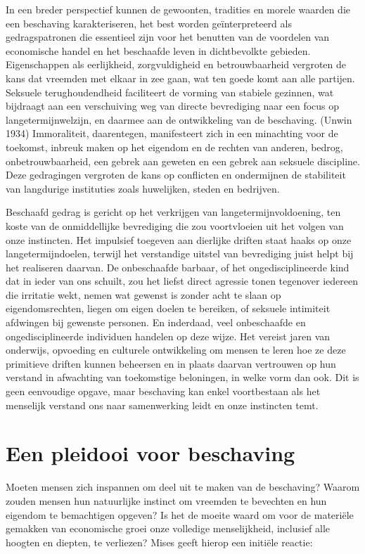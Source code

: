 \documentclass[
  a5paper,
  smalldemyvopaper,11pt,twoside,onecolumn,openright,extrafontsizes,
hidelinks]{memoir}
\begin{document}
In een breder perspectief kunnen de gewoonten, tradities en morele
waarden die een beschaving karakteriseren, het best worden
geïnterpreteerd als gedragspatronen die essentieel zijn voor het
benutten van de voordelen van economische handel en het beschaafde leven
in dichtbevolkte gebieden. Eigenschappen als eerlijkheid, zorgvuldigheid
en betrouwbaarheid vergroten de kans dat vreemden met elkaar in zee
gaan, wat ten goede komt aan alle partijen. Seksuele terughoudendheid
faciliteert de vorming van stabiele gezinnen, wat bijdraagt aan een
verschuiving weg van directe bevrediging naar een focus op
langetermijnwelzijn, en daarmee aan de ontwikkeling van de beschaving.
(Unwin 1934) Immoraliteit, daarentegen, manifesteert zich in een
minachting voor de toekomst, inbreuk maken op het eigendom en de rechten
van anderen, bedrog, onbetrouwbaarheid, een gebrek aan geweten en een
gebrek aan seksuele discipline. Deze gedragingen vergroten de kans op
conflicten en ondermijnen de stabiliteit van langdurige instituties
zoals huwelijken, steden en bedrijven.

Beschaafd gedrag is gericht op het verkrijgen van
langetermijnvoldoening, ten koste van de onmiddellijke bevrediging die
zou voortvloeien uit het volgen van onze instincten. Het impulsief
toegeven aan dierlijke driften staat haaks op onze langetermijndoelen,
terwijl het verstandige uitstel van bevrediging juist helpt bij het
realiseren daarvan. De onbeschaafde barbaar, of het ongedisciplineerde
kind dat in ieder van ons schuilt, zou het liefst direct agressie tonen
tegenover iedereen die irritatie wekt, nemen wat gewenst is zonder acht
te slaan op eigendomsrechten, liegen om eigen doelen te bereiken, of
seksuele intimiteit afdwingen bij gewenste personen. En inderdaad, veel
onbeschaafde en ongedisciplineerde individuen handelen op deze wijze.
Het vereist jaren van onderwijs, opvoeding en culturele ontwikkeling om
mensen te leren hoe ze deze primitieve driften kunnen beheersen en in
plaats daarvan vertrouwen op hun verstand in afwachting van toekomstige
beloningen, in welke vorm dan ook. Dit is geen eenvoudige opgave, maar
beschaving kan enkel voortbestaan als het menselijk verstand ons naar
samenwerking leidt en onze instincten temt.

\section{Een pleidooi voor
beschaving}\label{een-pleidooi-voor-beschaving}

Moeten mensen zich inspannen om deel uit te maken van de beschaving?
Waarom zouden mensen hun natuurlijke instinct om vreemden te bevechten
en hun eigendom te bemachtigen opgeven? Is het de moeite waard om voor
de materiële gemakken van economische groei onze volledige
menselijkheid, inclusief alle hoogten en diepten, te verliezen? Mises
geeft hierop een initiële reactie:
\end{document}
